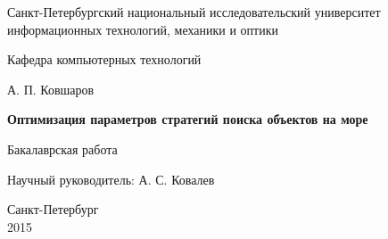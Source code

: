 \documentclass{report}
\theoremstyle{plain}
\theoremstyle{definition}
\numberwithin{theorem}{chapter}        %
\begin{document}

\initializefrontsections

\pagestyle{title}

\begin{center}
Санкт-Петербургский национальный исследовательский университет \\ информационных технологий, механики и оптики

\vspace{2cm}

Кафедра компьютерных технологий

\vspace{3cm}

{\Large А. П. Ковшаров}

\vspace{2cm}

\vbox{\LARGE\bfseries
Оптимизация параметров стратегий поиска объектов на море}

\vspace{4cm}

Бакалаврская работа 

\vspace{1cm}

{\Large Научный руководитель: А. С. Ковалев}

\vspace{5cm}

Санкт-Петербург\\ 2015
\end{center}

\newpage

\setcounter{page}{3}
\pagestyle{plain}



\tableofcontents


\def\t#1{\mbox{\texttt{\hbox{#1}}}}
\def\b#1{\textbf{#1}}
\def\tb#1{\t{\b{#1}}}

\def\cln#1{\t{#1}}
\def\pcn#1{\t{#1}}
\newcommand{\p}{\par Здесь будет текст...}
\def\putImgx#1#2{
  \texttt{[image: ../img/\#2]}
}

\def\putImg#1{
  \texttt{[image: ../img/\#1]}
}

\def\drawfigure#1#2{
        \begin{figure}
        \putImg{#1}
        \caption{#2}
        \label{#1}
        \end{figure}
}
\def\drawfigurex#1#2#3#4{
        \begin{figure}[ht]
          \begin{center}
            \putImgx{#4}{#1}
            \caption{#2}
            \label{#3}
          \end{center}
        \end{figure}
}
 
\end{document}
